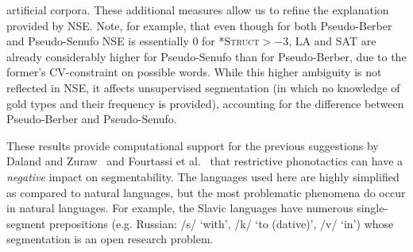 \documentclass[11pt]{article}
\begin{document}
artificial corpora. These additional measures allow us to refine the explanation provided by NSE. Note, for example, that even though for both Pseudo-Berber and Pseudo-Senufo NSE is essentially 0 for \textsc{*Struct}$> -3$, LA and SAT are already considerably higher for Pseudo-Senufo than for Pseudo-Berber, due to the former's CV-constraint on possible words. While this higher ambiguity is not reflected in NSE, it affects unsupervised segmentation (in which no knowledge of gold types and their frequency is provided), accounting for the difference between Pseudo-Berber and Pseudo-Senufo.

These results provide computational support for the previous suggestions by Daland and Zuraw~ and Fourtassi et al.~ that restrictive phonotactics can have a \emph{negative} impact on segmentability. The languages used here are highly simplified as compared to natural languages, but the most problematic phenomena do occur in natural languages. For example, the Slavic languages have numerous single-segment prepositions (e.g. Russian: /s/ `with', /k/ `to (dative)', /v/ `in') whose segmentation is an open research problem.
\end{document}
